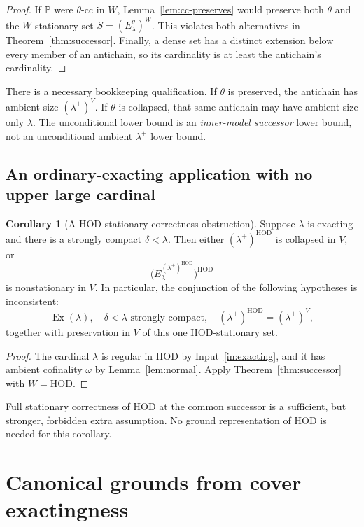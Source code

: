 \documentclass[11pt,letterpaper]{article}
\theoremstyle{definition}
\newtheorem{corollary}[definition]{Corollary}
\numberwithin{equation}{section}
\newcommand{\HOD}{\mathrm{HOD}}
\newcommand{\Ex}{\operatorname{Ex}}
\newcommand{\PP}{\mathbb P}
\newcommand{\cc}{\text{-cc}}
\begin{document}
\begin{proof}
If $\PP$ were $\theta\cc$ in $W$, Lemma~\ref{lem:cc-preserves} would preserve both $\theta$ and the $W$-stationary set $S=(E^\theta_\lambda)^W$. This violates both alternatives in Theorem~\ref{thm:successor}. Finally, a dense set has a distinct extension below every member of an antichain, so its cardinality is at least the antichain's cardinality.
\end{proof}

There is a necessary bookkeeping qualification. If $\theta$ is preserved, the antichain has ambient size $(\lambda^+)^V$. If $\theta$ is collapsed, that same antichain may have ambient size only $\lambda$. The unconditional lower bound is an \emph{inner-model successor} lower bound, not an unconditional ambient $\lambda^+$ lower bound.

\subsection{An ordinary-exacting application with no upper large cardinal}

\begin{corollary}[A HOD stationary-correctness obstruction]\label{cor:hod-stationary}
Suppose $\lambda$ is exacting and there is a strongly compact $\delta<\lambda$. Then either $(\lambda^+)^{\HOD}$ is collapsed in $V$, or
\[
\bigl(E^{(\lambda^+)^{\HOD}}_\lambda\bigr)^{\HOD}
\]
is nonstationary in $V$. In particular, the conjunction of the following hypotheses is inconsistent:
\[
\Ex(\lambda),\quad\delta<\lambda\text{ strongly compact},\quad
(\lambda^+)^{\HOD}=(\lambda^+)^V,
\]
together with preservation in $V$ of this one HOD-stationary set.
\end{corollary}

\begin{proof}
The cardinal $\lambda$ is regular in $\HOD$ by Input~\ref{in:exacting}, and it has ambient cofinality $\omega$ by Lemma~\ref{lem:normal}. Apply Theorem~\ref{thm:successor} with $W=\HOD$.
\end{proof}

Full stationary correctness of $\HOD$ at the common successor is a sufficient, but stronger, forbidden extra assumption. No ground representation of $\HOD$ is needed for this corollary.

\section{Canonical grounds from cover exactingness}\label{sec:hcd}
\end{document}
